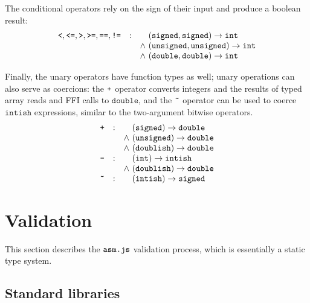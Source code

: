 \documentclass{article}
\newcommand{\funty}[2]{({#1}) \rightarrow {#2}}
\newcommand{\mathjs}[1]{\mbox{\texttt{{#1}}}}
\newcommand{\unsigned}{\mathtt{unsigned}}
\newcommand{\signed}{\mathtt{signed}}
\newcommand{\double}{\mathtt{double}}
\renewcommand{\int}{\mathtt{int}}
\newcommand{\intish}{\mathtt{intish}}
\newcommand{\doublish}{\mathtt{doublish}}
\begin{document}
The conditional operators rely on the sign of their input and produce
a boolean result:
\[
\begin{array}{rcc@{\ }l}
\mathjs{<}, \mathjs{<=}, \mathjs{>}, \mathjs{>=}, \mathjs{==}, \mathjs{!=}
                 & : &       & \funty{\signed, \signed}{\int} \\
                 &   & \land & \funty{\unsigned, \unsigned}{\int} \\
                 &   & \land & \funty{\double, \double}{\int} \\
\end{array}
\]

Finally, the unary operators have function types as well; unary
operations can also serve as coercions: the $\mathjs{+}$ operator
converts integers and the results of typed array reads and FFI calls
to $\double$, and the $\mathjs{\~{}}$ operator can be used to coerce
$\intish$ expressions, similar to the two-argument bitwise operators.
\[
\begin{array}{rcc@{\ }l}
\mathjs{+}       & : &       & \funty{\signed}{\double} \\
                 &   & \land & \funty{\unsigned}{\double} \\
                 &   & \land & \funty{\doublish}{\double} \\
\mathjs{-}       & : &       & \funty{\int}{\intish} \\
                 &   & \land & \funty{\doublish}{\double} \\
\mathjs{\~{}}    & : &       & \funty{\intish}{\signed} \\
\end{array}
\]

\section{Validation}

This section describes the $\mathjs{asm.js}$ validation process, which
is essentially a static type system.

\subsection{Standard libraries}
\end{document}
